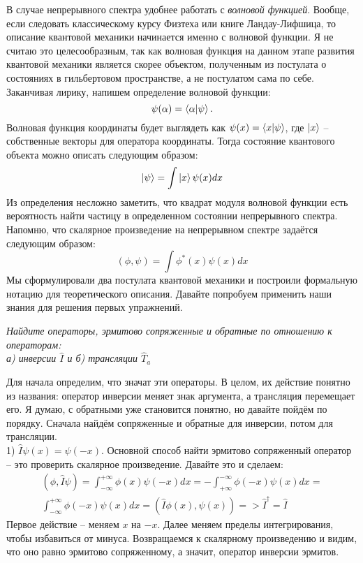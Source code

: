 В случае непрерывного спектра удобнее работать с \textit{волновой функцией}. Вообще, если следовать классическому курсу Физтеха или книге Ландау-Лифшица, то описание квантовой механики начинается именно с волновой функции. Я не считаю это целесообразным, так как волновая функция на данном этапе развития квантовой механики является скорее объектом, полученным из постулата о состояниях в гильбертовом пространстве, а не постулатом сама по себе. Заканчивая лирику, напишем определение волновой функции:
\[
\psi(\alpha) = \bra{\alpha}\ket{\psi}.
\]
Волновая функция координаты будет выглядеть как $\psi(x) = \bra{x}\ket{\psi}$, где $\ket{x}$ -- собственные векторы для оператора координаты. Тогда состояние квантового объекта можно описать следующим образом:
\[
\ket{\psi} = \int\ket{x}\psi(x)dx
\]
Из определения несложно заметить, что квадрат модуля волновой функции есть вероятность найти частицу в определенном состоянии непрерывного спектра. Напомню, что скалярное произведение на непрерывном спектре задаётся следующим образом:
\[
(\phi, \psi) = \int \phi^*(x) \psi(x) dx
\]
\newpage
Мы сформулировали два постулата квантовой механики и построили формальную нотацию для теоретического описания. Давайте попробуем применить наши знания для решения первых упражнений.
\begin{center}
\textit{Найдите операторы, эрмитово сопряженные и обратные по отношению к операторам:\\ а) инверсии $\hat I$ и б) трансляции $\hat T_a$}
\end{center}
Для начала определим, что значат эти операторы. В целом, их действие понятно из названия: оператор инверсии меняет знак аргумента, а трансляция перемещает его. Я думаю, с обратными уже становится понятно, но давайте пойдём по порядку. Сначала найдём сопряженные и обратные для инверсии, потом для трансляции.\\
1) $\hat I \psi(x) = \psi(-x)$. Основной способ найти эрмитово сопряженный оператор -- это проверить скалярное произведение. Давайте это и сделаем:
\begin{multline*}
(\phi, \hat{I}\psi)  = \int^{+\infty}_{-\infty} \phi(x) \psi(-x) dx = -\int^{-\infty}_{+\infty} \phi(-x) \psi(x) dx =\\ \int^{+\infty}_{-\infty}\phi(-x) \psi(x) dx = (\hat{I}\phi(x), \psi(x)) => \hat I^{\dagger} = \hat I    
\end{multline*}
Первое действие -- меняем $x$ на $-x$. Далее меняем пределы интегрирования, чтобы избавиться от минуса. Возвращаемся к скалярному произведению и видим, что оно равно эрмитово сопряженному, а значит, оператор инверсии эрмитов.\\
